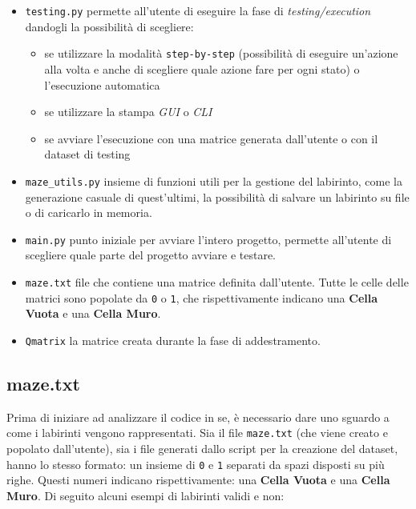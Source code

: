 \begin{itemize}
	\item \lstinline[style=cmd]|testing.py| permette all'utente di eseguire la fase di \textit{testing/execution} dandogli la possibilit\`{a} di scegliere:
	\begin{itemize}
		\item se utilizzare la modalit\`{a} \lstinline[style=cmd]|step-by-step| (possibilit\`{a} di eseguire un'azione alla volta e anche di scegliere quale azione fare per ogni stato) o l'esecuzione automatica
		\item se utilizzare la stampa \textit{GUI} o \textit{CLI}
		\item se avviare l'esecuzione con una matrice generata dall'utente o con il dataset di testing
	\end{itemize}
	\item \lstinline[style=cmd]|maze_utils.py| insieme di funzioni utili per la gestione del labirinto, come la generazione casuale di quest'ultimi, la possibilit\`{a} di salvare un labirinto su file o di caricarlo in memoria.
	\item \lstinline[style=cmd]|main.py| punto iniziale per avviare l'intero progetto, permette all'utente di scegliere quale parte del progetto avviare e testare.
	\item \lstinline[style=cmd]|maze.txt| file che contiene una matrice definita dall'utente. Tutte le celle delle matrici sono popolate da \lstinline[style=cmd]|0| o \lstinline[style=cmd]|1|, che rispettivamente indicano una \textbf{Cella Vuota} e una \textbf{Cella Muro}.
	\item \lstinline[style=cmd]|Qmatrix| la matrice creata durante la fase di addestramento.
\end{itemize}

\subsection{maze.txt}

Prima di iniziare ad analizzare il codice in se, \`{e} necessario dare uno sguardo a come i labirinti vengono rappresentati. Sia il file \lstinline[style=cmd]|maze.txt| (che viene creato e popolato dall'utente), sia i file generati dallo script per la creazione del dataset, hanno lo stesso formato: un insieme di \lstinline[style=cmd]|0| e \lstinline[style=cmd]|1| separati da spazi disposti su pi\`{u} righe. Questi numeri indicano rispettivamente: una \textbf{Cella Vuota} e una \textbf{Cella Muro}.
Di seguito alcuni esempi di labirinti validi e non:\\

